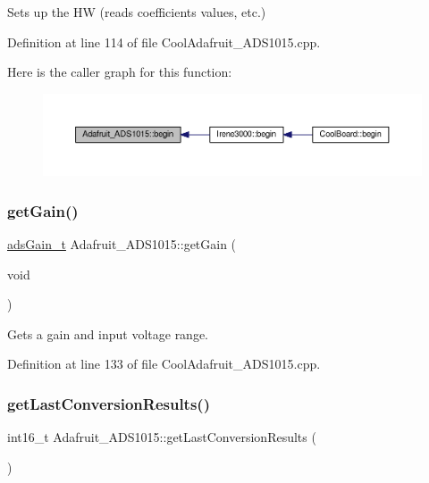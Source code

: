 Sets up the HW (reads coefficients values, etc.) 



Definition at line 114 of file Cool\+Adafruit\+\_\+\+A\+D\+S1015.\+cpp.

Here is the caller graph for this function\+:\nopagebreak
\begin{figure}[H]
\begin{center}
\leavevmode
\includegraphics[width=350pt]{class_adafruit___a_d_s1015_a6eba7c3cd854927f60883bb371e5faa6_icgraph}
\end{center}
\end{figure}
\mbox{\label{class_adafruit___a_d_s1015_a6232d089aaa82226bc34623fdf92237c}} 
\subsubsection{\texorpdfstring{get\+Gain()}{getGain()}}
{\footnotesize\ttfamily \hyperlink{_cool_adafruit___a_d_s1015_8h_a3d6c0e15829a207b9155890811fa4781}{ads\+Gain\+\_\+t} Adafruit\+\_\+\+A\+D\+S1015\+::get\+Gain (\begin{DoxyParamCaption}\item[{void}]{ }\end{DoxyParamCaption})}



Gets a gain and input voltage range. 



Definition at line 133 of file Cool\+Adafruit\+\_\+\+A\+D\+S1015.\+cpp.

\mbox{\label{class_adafruit___a_d_s1015_ad8f36d80847020778425107f6451a8c2}} 
\subsubsection{\texorpdfstring{get\+Last\+Conversion\+Results()}{getLastConversionResults()}}
{\footnotesize\ttfamily int16\+\_\+t Adafruit\+\_\+\+A\+D\+S1015\+::get\+Last\+Conversion\+Results (\begin{DoxyParamCaption}{ }\end{DoxyParamCaption})}



